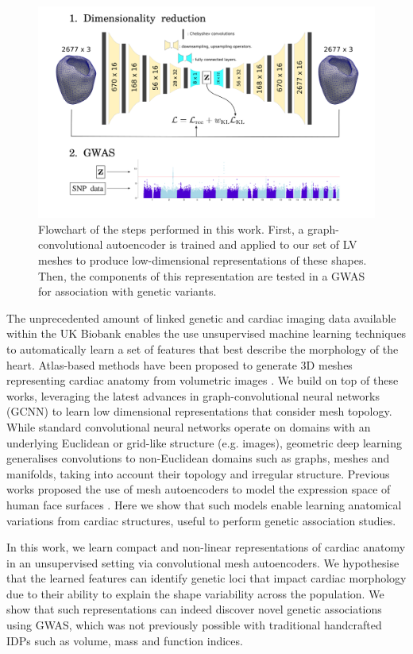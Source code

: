 \begin{figure}
\includegraphics[width=\textwidth]{figs/workflow.png}
\caption{Flowchart of the steps performed in this work. First, a graph-convolutional autoencoder is trained and applied to our set of LV meshes to produce low-dimensional representations of these shapes. Then, the components of this representation are tested in a GWAS for association with genetic variants.}
\label{fig:flowchart}
\end{figure}

The unprecedented amount of linked genetic and cardiac imaging data available within the UK Biobank \cite{ref_ukbb} enables the use unsupervised machine learning techniques to automatically learn a set of features that best describe the morphology of the heart. Atlas-based methods have been proposed to generate 3D meshes representing cardiac anatomy from volumetric images \cite{ref_rahman, ref_zhuang_regis_2O10}. We build on top of these works, leveraging the latest advances in graph-convolutional neural networks (GCNN) \cite{ref_bronstein_geom_DL} to learn low dimensional representations that consider mesh topology. While standard convolutional neural networks operate on domains with an underlying Euclidean or grid-like structure (e.g. images), geometric deep learning generalises convolutions to non-Euclidean domains such as graphs, meshes and manifolds, taking into account their topology and irregular structure. Previous works proposed the use of mesh autoencoders to model the expression space of human face surfaces \cite{ref_coma}. Here we show that such models enable learning anatomical variations from cardiac structures, useful to perform genetic association studies.

In this work, we learn compact and non-linear representations of cardiac anatomy in an unsupervised setting via convolutional mesh autoencoders. We hypothesise that the learned features can identify genetic loci that impact cardiac morphology due to their ability to explain the shape variability across the population. We show that such representations can indeed discover novel genetic associations using GWAS, which was not previously possible with traditional handcrafted IDPs such as volume, mass and function indices. 
